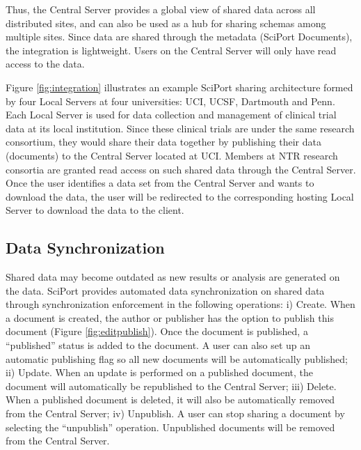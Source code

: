 \documentclass{doublecol-new}
\theoremstyle{TH}{
\newtheorem{lemma}{Lemma}
\newtheorem{theorem}[lemma]{Theorem}
\newtheorem{corrolary}[lemma]{Corrolary}
\newtheorem{conjecture}[lemma]{Conjecture}
\newtheorem{proposition}[lemma]{Proposition}
\newtheorem{claim}[lemma]{Claim}
\newtheorem{stheorem}[lemma]{Wrong Theorem}
\newtheorem{algorithm}{Algorithm}
}
\theoremstyle{THrm}{
\newtheorem{definition}{Definition}[section]
\newtheorem{question}{Question}[section]
\newtheorem{remark}{Remark}
\newtheorem{scheme}{Scheme}
}
\theoremstyle{THhit}{
\newtheorem{case}{Case}[section]
}
\begin{document}
Thus, the Central Server provides a global view of shared data across all
distributed sites, and can also be used as a hub for sharing schemas among
multiple sites. Since data are shared through the metadata (SciPort
Documents), the integration is lightweight. Users on the Central Server will
only have read access to the data.

Figure \ref{fig:integration} illustrates an example SciPort sharing
architecture formed by four Local Servers at four universities: UCI,
UCSF, Dartmouth and Penn. Each Local Server is used for data
collection and management of clinical trial data at its local
institution. Since these clinical trials are under the same research
consortium, they would share their data together by publishing their
data (documents) to the Central Server located at UCI. Members at
NTR research consortia are granted read access on such shared data
through the Central Server. Once the user identifies a data set from
the Central Server and wants to download the data, the user will be
redirected to the corresponding hosting Local Server to download the
data to the client.









\subsection{Data Synchronization}

Shared data may become outdated as new results or analysis are
generated on the data. SciPort provides automated data
synchronization on shared data through synchronization enforcement
in the following operations: i) Create. When a document is created,
the author or publisher has the option to publish this document
(Figure \ref{fig:editpublish}). Once the document is   published, a
``published'' status is added to the document. A user can   also set
up an automatic publishing flag so all new documents will be
automatically published; ii) Update. When an update is performed on
a published document, the document will automatically be republished
to the Central Server; iii) Delete. When a published document is
deleted, it will also be automatically removed from the Central
Server;  iv) Unpublish. A user can stop sharing a document by
selecting the ``unpublish'' operation.  Unpublished documents will
be removed from the Central Server.
\end{document}

